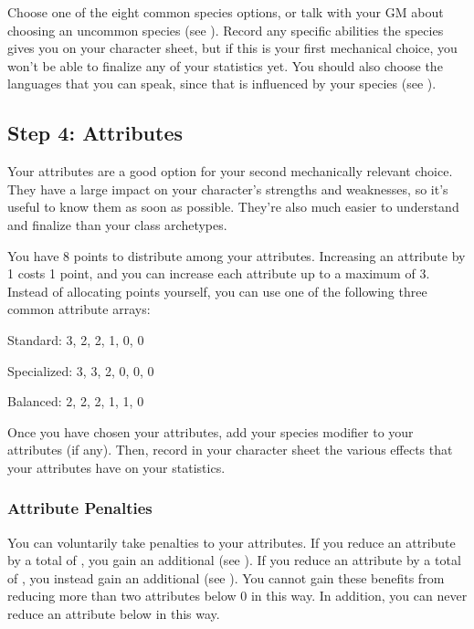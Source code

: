     Choose one of the eight common species options, or talk with your GM about choosing an uncommon species (see ).
    Record any specific abilities the species gives you on your character sheet, but if this is your first mechanical choice, you won't be able to finalize any of your statistics yet.
    You should also choose the languages that you can speak, since that is influenced by your species (see ).

  \subsection{Step 4: Attributes}\label{Step 4: Attributes}
    Your attributes are a good option for your second mechanically relevant choice.
    They have a large impact on your character's strengths and weaknesses, so it's useful to know them as soon as possible.
    They're also much easier to understand and finalize than your class archetypes.

    You have 8 points to distribute among your attributes.
    Increasing an attribute by 1 costs 1 point, and you can increase each attribute up to a maximum of 3.
    Instead of allocating points yourself, you can use one of the following three common attribute arrays:
    \begin{raggeditemize}
      \item Standard: 3, 2, 2, 1, 0, 0
      \item Specialized: 3, 3, 2, 0, 0, 0
      \item Balanced: 2, 2, 2, 1, 1, 0
    \end{raggeditemize}

    Once you have chosen your attributes, add your species modifier to your attributes (if any).
    Then, record in your character sheet the various effects that your attributes have on your statistics.

    \subsubsection{Attribute Penalties}\label{Attribute Penalties}
      You can voluntarily take penalties to your attributes.
      If you reduce an attribute by a total of , you gain an additional  (see ).
      If you reduce an attribute by a total of , you instead gain an additional  (see ).
      You cannot gain these benefits from reducing more than two attributes below 0 in this way.
      In addition, you can never reduce an attribute below  in this way.

